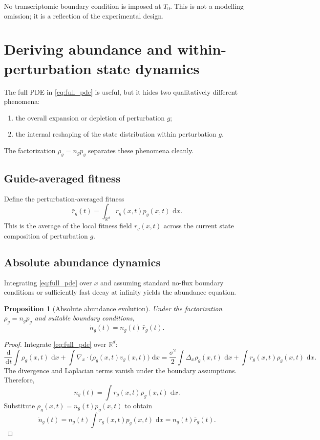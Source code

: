 \documentclass[11pt]{article}
\newcommand{\R}{\mathbb{R}}
\newcommand{\1}{\mathbf{1}}
\newcommand{\dd}{\,\mathrm{d}}
\newcommand{\Tzero}{T_0}
\theoremstyle{plain}
\newtheorem{proposition}{Proposition}
\begin{document}
No transcriptomic boundary condition is imposed at $\Tzero$. This is not a modelling omission; it is a reflection of the experimental design.

\section{Deriving abundance and within-perturbation state dynamics}

The full PDE in \eqref{eq:full_pde} is useful, but it hides two qualitatively different phenomena:
\begin{enumerate}
    \item the overall expansion or depletion of perturbation $g$;
    \item the internal reshaping of the state distribution within perturbation $g$.
\end{enumerate}

The factorization $\rho_g=n_gp_g$ separates these phenomena cleanly.

\subsection{Guide-averaged fitness}

Define the perturbation-averaged fitness
\begin{equation}
\bar r_g(t) = \int_{\R^d} r_g(x,t) p_g(x,t)\,\dd x.
\label{eq:avg_fitness}
\end{equation}
This is the average of the local fitness field $r_g(x,t)$ across the current state composition of perturbation $g$.

\subsection{Absolute abundance dynamics}

Integrating \eqref{eq:full_pde} over $x$ and assuming standard no-flux boundary conditions or sufficiently fast decay at infinity yields the abundance equation.

\begin{proposition}[Absolute abundance evolution]
Under the factorization $\rho_g=n_gp_g$ and suitable boundary conditions,
\begin{equation}
\dot n_g(t)=n_g(t)\,\bar r_g(t).
\label{eq:ng_dynamics}
\end{equation}
\end{proposition}

\begin{proof}
Integrate \eqref{eq:full_pde} over $\R^d$:
\[
\frac{\dd}{\dd t}\int \rho_g(x,t)\,\dd x
+
\int \nabla_x\cdot\big(\rho_g(x,t)v_g(x,t)\big)\,\dd x
=
\frac{\sigma^2}{2}\int \Delta_x\rho_g(x,t)\,\dd x
+
\int r_g(x,t)\rho_g(x,t)\,\dd x.
\]
The divergence and Laplacian terms vanish under the boundary assumptions. Therefore,
\[
\dot n_g(t)=\int r_g(x,t)\rho_g(x,t)\,\dd x.
\]
Substitute $\rho_g(x,t)=n_g(t)p_g(x,t)$ to obtain
\[
\dot n_g(t)=n_g(t)\int r_g(x,t)p_g(x,t)\,\dd x = n_g(t)\bar r_g(t).
\]
\end{proof}
\end{document}
